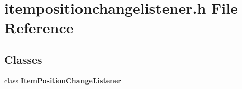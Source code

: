 \section{itempositionchangelistener.\+h File Reference}
\label{bk3_2curve_2itempositionchangelistener_8h}
\subsection*{Classes}
\begin{DoxyCompactItemize}
\item 
class {\bf Item\+Position\+Change\+Listener}
\end{DoxyCompactItemize}
